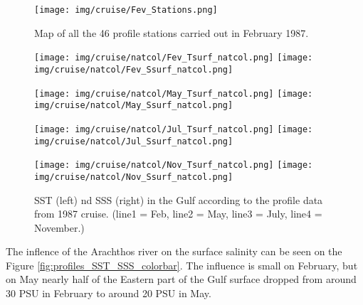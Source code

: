 \documentclass[english]{PFeENSTA}
\begin{document}
{\begin{figure}[!h]
\centering
\texttt{[image: img/cruise/Fev\_Stations.png]}
\caption{\label{fig:Feb_stations}Map of all the 46 profile stations carried out in February 1987.}
\end{figure}

\begin{figure}[H]
	\begin{minipage}[h!]{1\linewidth}
		\centering
		\texttt{[image: img/cruise/natcol/Fev\_Tsurf\_natcol.png]}
		\texttt{[image: img/cruise/natcol/Fev\_Ssurf\_natcol.png]}
	\end{minipage}
	\begin{minipage}[h!]{1\linewidth}
		\centering
		\texttt{[image: img/cruise/natcol/May\_Tsurf\_natcol.png]}
		\texttt{[image: img/cruise/natcol/May\_Ssurf\_natcol.png]}
	\end{minipage}
	\begin{minipage}[h!]{1\linewidth}
		\centering
		\texttt{[image: img/cruise/natcol/Jul\_Tsurf\_natcol.png]}
		\texttt{[image: img/cruise/natcol/Jul\_Ssurf\_natcol.png]}
	\end{minipage}
	\begin{minipage}[h!]{1\linewidth}
		\centering
		\texttt{[image: img/cruise/natcol/Nov\_Tsurf\_natcol.png]}
		\texttt{[image: img/cruise/natcol/Nov\_Ssurf\_natcol.png]}
	\end{minipage} 
   
   \caption{\label{fig:profiles_SST_SSS_natcol} SST (left) nd SSS (right)  in the Gulf according to the profile data from 1987 cruise. (line1 = Feb, line2 = May, line3 = July, line4 = November.)}
\end{figure}

The inflence of the Arachthos river on the surface salinity can be seen on the Figure \ref{fig:profiles_SST_SSS_colorbar}. The influence is small on February, but on May nearly half of the Eastern part of the Gulf surface dropped from around 30 PSU in February to around 20 PSU in May.

}
\end{document}
